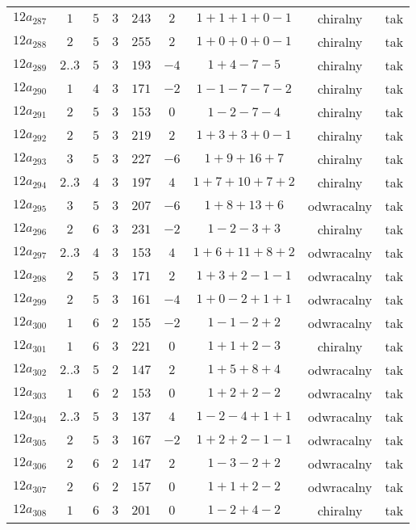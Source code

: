 \begin{longtable}{ccccccccc}
$12a_{287}$ & $1$ & $5$ & $3$ & $243$ & $2$ & $1+1+1+0-1$ & chiralny & tak \\
$12a_{288}$ & $2$ & $5$ & $3$ & $255$ & $2$ & $1+0+0+0-1$ & chiralny & tak \\
$12a_{289}$ & $2..3$ & $5$ & $3$ & $193$ & $-4$ & $1+4-7-5$ & chiralny & tak \\
$12a_{290}$ & $1$ & $4$ & $3$ & $171$ & $-2$ & $1-1-7-7-2$ & chiralny & tak \\
$12a_{291}$ & $2$ & $5$ & $3$ & $153$ & $0$ & $1-2-7-4$ & chiralny & tak \\
$12a_{292}$ & $2$ & $5$ & $3$ & $219$ & $2$ & $1+3+3+0-1$ & chiralny & tak \\
$12a_{293}$ & $3$ & $5$ & $3$ & $227$ & $-6$ & $1+9+16+7$ & chiralny & tak \\
$12a_{294}$ & $2..3$ & $4$ & $3$ & $197$ & $4$ & $1+7+10+7+2$ & chiralny & tak \\
$12a_{295}$ & $3$ & $5$ & $3$ & $207$ & $-6$ & $1+8+13+6$ & odwracalny & tak \\
$12a_{296}$ & $2$ & $6$ & $3$ & $231$ & $-2$ & $1-2-3+3$ & chiralny & tak \\
$12a_{297}$ & $2..3$ & $4$ & $3$ & $153$ & $4$ & $1+6+11+8+2$ & odwracalny & tak \\
$12a_{298}$ & $2$ & $5$ & $3$ & $171$ & $2$ & $1+3+2-1-1$ & odwracalny & tak \\
$12a_{299}$ & $2$ & $5$ & $3$ & $161$ & $-4$ & $1+0-2+1+1$ & odwracalny & tak \\
$12a_{300}$ & $1$ & $6$ & $2$ & $155$ & $-2$ & $1-1-2+2$ & odwracalny & tak \\
$12a_{301}$ & $1$ & $6$ & $3$ & $221$ & $0$ & $1+1+2-3$ & chiralny & tak \\
$12a_{302}$ & $2..3$ & $5$ & $2$ & $147$ & $2$ & $1+5+8+4$ & odwracalny & tak \\
$12a_{303}$ & $1$ & $6$ & $2$ & $153$ & $0$ & $1+2+2-2$ & odwracalny & tak \\
$12a_{304}$ & $2..3$ & $5$ & $3$ & $137$ & $4$ & $1-2-4+1+1$ & odwracalny & tak \\
$12a_{305}$ & $2$ & $5$ & $3$ & $167$ & $-2$ & $1+2+2-1-1$ & odwracalny & tak \\
$12a_{306}$ & $2$ & $6$ & $2$ & $147$ & $2$ & $1-3-2+2$ & odwracalny & tak \\
$12a_{307}$ & $2$ & $6$ & $2$ & $157$ & $0$ & $1+1+2-2$ & odwracalny & tak \\
$12a_{308}$ & $1$ & $6$ & $3$ & $201$ & $0$ & $1-2+4-2$ & chiralny & tak \\

\end{longtable}
